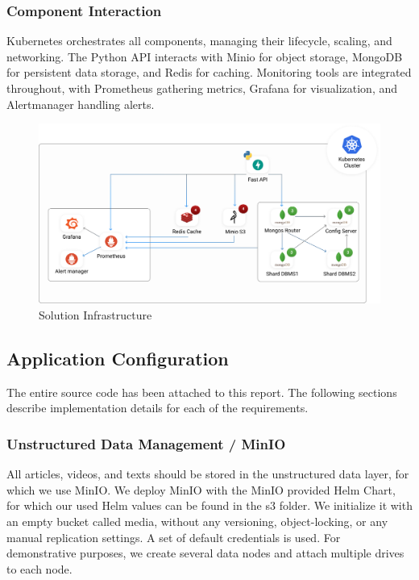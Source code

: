 \documentclass{report}
\begin{document}
    \subsubsection{Component Interaction}

    Kubernetes orchestrates all components, managing their lifecycle, scaling, and networking. The Python API interacts with Minio for object storage, MongoDB for persistent data storage, and Redis for caching. Monitoring tools are integrated throughout, with Prometheus gathering metrics, Grafana for visualization, and Alertmanager handling alerts.

    \begin{figure}[h]
        \centering
        \includegraphics[width=\textwidth]{images/architecture}
        \caption{Solution Infrastructure}
        \label{fig:cluster}
    \end{figure}

    \subsection{Application Configuration}

    The entire source code has been attached to this report. The following sections describe implementation details for each of the requirements.

    \subsubsection{Unstructured Data Management / MinIO}
    All articles, videos, and texts should be stored in the unstructured data layer, for which we use MinIO. We deploy MinIO with the MinIO provided Helm Chart, for which our used Helm values can be found in the s3 folder. We initialize it with an empty bucket called media, without any versioning, object-locking, or any manual replication settings. A set of default credentials is used. For demonstrative purposes, we create several data nodes and attach multiple drives to each node.
\end{document}
